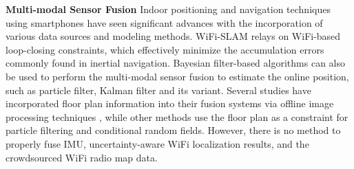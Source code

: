 \noindent \textbf{Multi-modal Sensor Fusion}
Indoor positioning and navigation techniques using smartphones have seen significant advances with the incorporation of various data sources and modeling methods. WiFi-SLAM \cite{ferris2007wifi,mirowski2013signalslam} relays on WiFi-based loop-closing constraints, which effectively minimize the accumulation errors commonly found in inertial navigation. Bayesian filter-based algorithms can also be used to perform the multi-modal sensor fusion to estimate the online position, such as particle filter\cite{zou2017Accurate,Hong2014WaP,carrera2016real}, Kalman filter and its variant\cite{Hellmers2013IMU,Poulose2019Indoor,Feng2020Kalman}. Several studies have incorporated floor plan information into their fusion systems via offline image processing techniques \cite{herath2021fusiondhl,ma2017pedestrian}, while other methods use the floor plan as a constraint for particle filtering \cite{Hong2014WaP,carrera2016real} and conditional random fields\cite{xiao2014lightweight}. However, there is no method to properly fuse IMU, uncertainty-aware WiFi localization results, and the crowdsourced WiFi radio map data.

